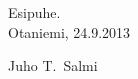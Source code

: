 \documentclass[finnish,12pt,a4paper,pdftex]{article}
\begin{document}
Esipuhe.
\\

\vspace{5cm}
Otaniemi, 24.9.2013

\vspace{5mm}
{\hfill Juho T.\ Salmi \hspace{1cm}}

\newpage


\thesistableofcontents


%
\end{document}
